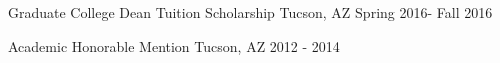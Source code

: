 



\begin{cvhonors}

  \cvhonor
    {Graduate College Dean Tuition Scholarship} %
    {} %
    {Tucson, AZ} %
    {Spring 2016- Fall 2016} %


  \cvhonor
    {Academic Honorable Mention} %
    {} %
    {Tucson, AZ} %
    {2012 - 2014} %


\end{cvhonors}


